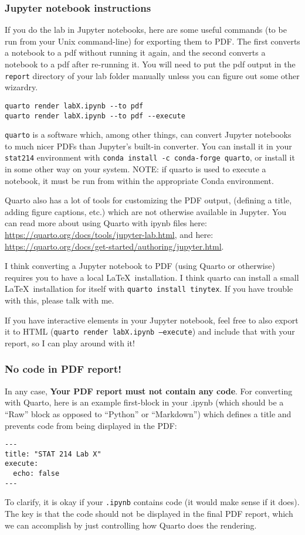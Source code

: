\documentclass[letterpaper,12pt]{article}
\begin{document}
\subsubsection{Jupyter notebook instructions}
If you do the lab in Jupyter notebooks, here are some useful commands (to be run from your Unix command-line) for exporting them to PDF. The first converts a notebook to a pdf without running it again, and the second converts a notebook to a pdf after re-running it. You will need to put the pdf output in the \texttt{report} directory of your lab folder manually unless you can figure out some other wizardry.
\begin{verbatim}
quarto render labX.ipynb --to pdf
quarto render labX.ipynb --to pdf --execute
\end{verbatim}
\texttt{quarto} is a software which, among other things, can convert Jupyter notebooks to much nicer PDFs than Jupyter's built-in converter. You can install it in your \texttt{stat214} environment with \texttt{conda install -c conda-forge quarto}, or install it in some other way on your system. NOTE: if quarto is used to execute a notebook, it must be run from within the appropriate Conda environment.

Quarto also has a lot of tools for customizing the PDF output, (defining a title, adding figure captions, etc.) which are not otherwise available in Jupyter. You can read more about using Quarto with ipynb files here: \url{https://quarto.org/docs/tools/jupyter-lab.html}, and here: \url{https://quarto.org/docs/get-started/authoring/jupyter.html}.

I think converting a Jupyter notebook to PDF (using Quarto or otherwise) requires you to have a local \LaTeX\ installation. I think quarto can install a small \LaTeX\ installation for itself with \texttt{quarto install tinytex}. If you have trouble with this, please talk with me.

If you have interactive elements in your Jupyter notebook, feel free to also export it to HTML (\texttt{quarto render labX.ipynb --execute}) and include that with your report, so I can play around with it!


\subsubsection{No code in PDF report!}
In any case, \textbf{Your PDF report must not contain any code}. For converting with Quarto, here is an example first-block in your .ipynb (which should be a ``Raw'' block as opposed to ``Python'' or ``Markdown'') which defines a title and prevents code from being displayed in the PDF:
\begin{verbatim}
---
title: "STAT 214 Lab X"
execute:
  echo: false
---
\end{verbatim}
To clarify, it is okay if your \texttt{.ipynb} contains code (it would make sense if it does). The key is that the code should not be displayed in the final PDF report, which we can accomplish by just controlling how Quarto does the rendering.
\end{document}
